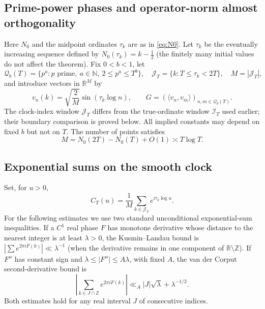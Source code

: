 \documentclass[11pt,reqno]{amsart}
\numberwithin{equation}{section}
\begin{document}
\subsection{Prime-power phases and operator-norm almost orthogonality}
Here $N_0$ and the midpoint ordinates $\tau_k$ are as in \eqref{eq:N0}. Let $\tau_k$ be the eventually increasing sequence defined by
$N_0(\tau_k)=k-\tfrac12$ (the finitely many initial values do not affect the theorem). Fix $0<b<1$, let
\begin{equation}
\mathcal Q_b(T)=\{p^a: p\text{ prime},\ a\in\mathbb N,\ 2\le p^a\le T^b\},\quad
\mathcal J_T=\{k:T\le\tau_k<2T\},\quad M=|\mathcal J_T|,
\label{pp:eq:sets}
\end{equation}
and introduce vectors in $\mathbb R^M$ by
\begin{equation}
 v_n(k)=\sqrt{\frac{2}{M}}\sin(\tau_k\log n),\qquad
 G=(\langle v_n,v_m\rangle)_{n,m\in\mathcal Q_b(T)}.
\label{pp:eq:gram}
\end{equation}
The clock-index window $\mathcal J_T$ differs from the true-ordinate window $\mathcal I_T$ used earlier; their boundary comparison is proved below. All implied constants may depend on fixed $b$ but not on $T$. The number of points satisfies
\begin{equation}
M=N_0(2T)-N_0(T)+O(1)\asymp T\log T.
\label{pp:eq:M}
\end{equation}

\subsection{Exponential sums on the smooth clock}
Set, for $u>0$,
\begin{equation}
C_T(u)=\frac1M\sum_{k\in\mathcal J_T}e^{i\tau_k\log u}.
\label{pp:eq:C}
\end{equation}
For the following estimates we use two standard unconditional exponential-sum inequalities. If a $C^1$ real phase $F$ has monotone derivative whose distance to the nearest integer is at least $\lambda>0$, the Kusmin--Landau bound is $|\sum e^{2\pi i F(k)}|\ll\lambda^{-1}$ (when the derivative remains in one component of $\mathbb R\setminus\mathbb Z$). If $F''$ has constant sign and $\lambda\le |F''|\le A\lambda$, with fixed $A$, the van der Corput second-derivative bound is
\begin{equation}
\left|\sum_{k\in J\cap\mathbb Z}e^{2\pi i F(k)}\right|
\ll_A |J|\sqrt\lambda+\lambda^{-1/2}.
\label{pp:eq:vdC}
\end{equation}
Both estimates hold for any real interval $J$ of consecutive indices.
\end{document}
